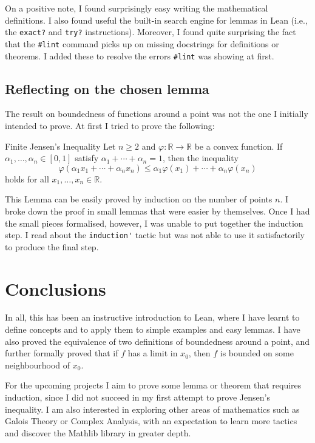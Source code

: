 \documentclass[a4paper,11pt]{article}
\theoremstyle{plain}
\newcommand{\R}{\ensuremath{\mathbb{R}}} %
\begin{document}
		On a positive note, I found surprisingly easy writing the mathematical definitions. I also found useful the built-in search engine for lemmas in Lean (i.e., the \lstinline|exact?| and \lstinline|try?| instructions). Moreover, I found quite surprising the fact that the \lstinline|#lint| command picks up on missing docstrings for definitions or theorems. I added these to resolve the errors \lstinline|#lint| was showing at first.
		
		\subsection{Reflecting on the chosen lemma}
		
		The result on boundedness of functions around a point was not the one I initially intended to prove. At first I tried to prove the following:\\
		
		\begin{lemma*}{Finite Jensen's Inequality}
			Let $n\geq 2$ and $\varphi:\R\rightarrow\R$ be a convex function. If $\alpha_1,\dots,\alpha_n\in[0,1]$ satisfy $\alpha_1+\cdots+\alpha_n=1$, then the inequality
			\begin{equation*}
				\varphi(\alpha_1x_1+\cdots+\alpha_nx_n)\leq\alpha_1\varphi(x_1)+\cdots+\alpha_n\varphi(x_n)
			\end{equation*}
			holds for all $x_1,\dots,x_n\in\R$.
		\end{lemma*}
		
		This Lemma can be easily proved by induction on the number of points $n$. I broke down the proof in small lemmas that were easier by themselves. Once I had the small pieces formalised, however, I was unable to put together the induction step. I read about the \lstinline|induction'| tactic but was not able to use it satisfactorily to produce the final step.
		
	\section{Conclusions}\label{sec:conclu}

	In all, this has been an instructive introduction to Lean, where I have learnt to define concepts and to apply them to simple examples and easy lemmas. I have also proved the equivalence of two definitions of boundedness around a point, and further formally proved that if $f$ has a limit in $x_0$, then $f$ is bounded on some neighbourhood of $x_0$.
	
	For the upcoming projects I aim to prove some lemma or theorem that requires induction, since I did not succeed in my first attempt to prove Jensen's inequality. I am also interested in exploring other areas of mathematics such as Galois Theory or Complex Analysis, with an expectation to learn more tactics and discover the Mathlib library in greater depth.
	
	{\small
		
		
	}
		 
\end{document}
